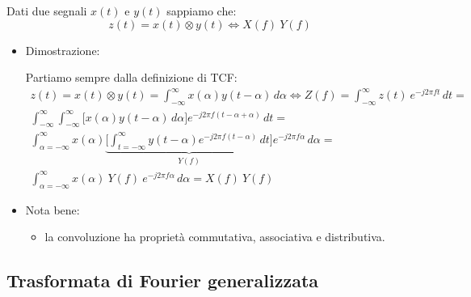 \documentclass[
]{article}
\providecommand{\tightlist}{%
  \setlength{\itemsep}{0pt}\setlength{\parskip}{0pt}}
\begin{document}
\begin{enumerate}
  Dati due segnali \(x(t)\) e \(y(t)\) sappiamo che: \[
  z(t) = x(t) \otimes y(t) \Longleftrightarrow X(f) \ Y(f)
  \]

  \begin{itemize}
  \item
    Dimostrazione:

    Partiamo sempre dalla definizione di TCF: \begin{gather*}
    z(t) = x(t) \otimes y(t) = \int_{-\infty}^{\infty} x(\alpha) y(t-\alpha) \,d\alpha \Longleftrightarrow Z(f) = \int_{-\infty}^{\infty} z(t) \ e^{-j2\pi ft} \,dt = \\  \int_{-\infty}^{\infty} \int_{-\infty}^{\infty} \Big [ x(\alpha) y(t -\alpha) \,d\alpha  \Big] e^{-j2\pi f(t-\alpha+\alpha)} \,dt =\\
    \int_{\alpha=-\infty}^{\infty} x(\alpha) \underbrace{\Big [\int_{t=-\infty}^{\infty}y(t-\alpha)e^{-j2\pi f(t-\alpha)}\,dt \Big ]}_{Y(f)}  e^{-j2\pi f\alpha} \,d\alpha = \\ \int_{\alpha=-\infty}^{\infty} x(\alpha) \ Y(f) \ e^{-j2\pi f\alpha}\,d\alpha = X(f) \ Y(f)
    \end{gather*}
  \item
    Nota bene:

    \begin{itemize}
    \tightlist
    \item
      la convoluzione ha proprietà commutativa, associativa e
      distributiva.
    \end{itemize}
  \end{itemize}
\end{enumerate}

\subsection{Trasformata di Fourier
generalizzata}\label{trasformata-di-fourier-generalizzata}
\end{document}

